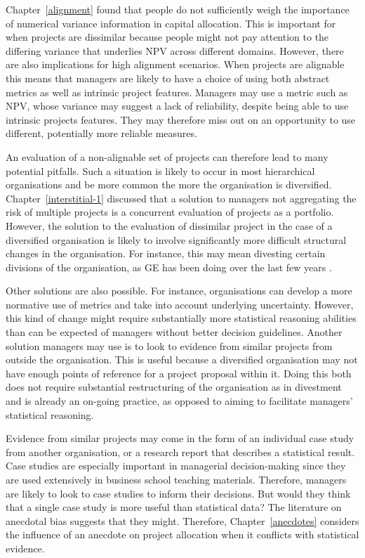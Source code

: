 \documentclass[a4paper, nobind, dvipsnames]{templates/ociamthesis}
\theoremstyle{definition}
\theoremstyle{definition}
\theoremstyle{definition}
\theoremstyle{definition}
\theoremstyle{remark}
\begin{document}
Chapter~\ref{alignment} found that people do not sufficiently weigh the
importance of numerical variance information in capital allocation. This is
important for when projects are dissimilar because people might not pay
attention to the differing variance that underlies NPV across different domains.
However, there are also implications for high alignment scenarios. When projects
are alignable this means that managers are likely to have a choice of using both
abstract metrics as well as intrinsic project features. Managers may use a
metric such as NPV, whose variance may suggest a lack of reliability, despite
being able to use intrinsic projects features. They may therefore miss out on an
opportunity to use different, potentially more reliable measures.

An evaluation of a non-alignable set of projects can therefore lead to many
potential pitfalls. Such a situation is likely to occur in most hierarchical
organisations and be more common the more the organisation is diversified.
Chapter~\ref{interstitial-1} discussed that a solution to managers not
aggregating the risk of multiple projects is a concurrent evaluation of projects
as a portfolio. However, the solution to the evaluation of dissimilar project in
the case of a diversified organisation is likely to involve significantly more
difficult structural changes in the organisation. For instance, this may mean
divesting certain divisions of the organisation, as GE has been doing over the
last few years \autocite{scott2018}.

Other solutions are also possible. For instance, organisations can develop a
more normative use of metrics and take into account underlying uncertainty.
However, this kind of change might require substantially more statistical
reasoning abilities than can be expected of managers without better decision
guidelines. Another solution managers may use is to look to evidence from
similar projects from outside the organisation. This is useful because a
diversified organisation may not have enough points of reference for a project
proposal within it. Doing this both does not require substantial restructuring
of the organisation as in divestment and is already an on-going practice, as
opposed to aiming to facilitate managers' statistical reasoning.

Evidence from similar projects may come in the form of an individual case study
from another organisation, or a research report that describes a statistical
result. Case studies are especially important in managerial decision-making
since they are used extensively in business school teaching materials.
Therefore, managers are likely to look to case studies to inform their
decisions. But would they think that a single case study is more useful than
statistical data? The literature on anecdotal bias suggests that they might.
Therefore, Chapter~\ref{anecdotes} considers the influence of an anecdote on
project allocation when it conflicts with statistical evidence.
\end{document}
